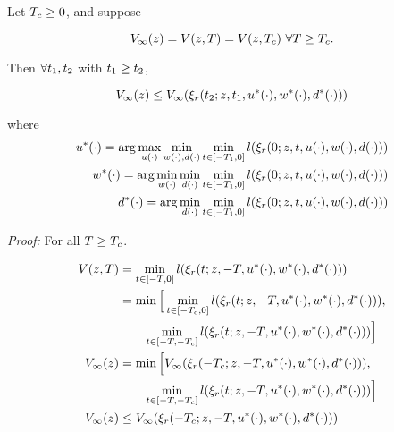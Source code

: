  \begin{thm}
   Let $T_c \ge 0$, and suppose
   
   \begin{equation}
   \label{eq:conv_valfunc}
   V_\infty(z) = V(z, T) = V(z, T_c) ~ \forall T \ge T_c.
   \end{equation}
   
   Then $\forall t_1, t_2$ with $t_1 \ge t_2$,
   
   \begin{equation}
   V_\infty(z) \le V_\infty(\xi_r(t_2; z, t_1, u^*(\cdot), w^*(\cdot), d^*(\cdot))) 
   \end{equation}
   
   \noindent where
   \begin{equation}
   \begin{aligned}
   u^*(\cdot) = \arg \max_{u(\cdot)} \min_{w(\cdot), d(\cdot)} \min_{t \in [-T_1, 0]} l(\xi_r(0; z, t, u(\cdot), w(\cdot), d(\cdot))) \\
   w^*(\cdot) = \arg \min_{w(\cdot)} \min_{d(\cdot)} \min_{t \in [-T_1, 0]} l(\xi_r(0; z, t, u(\cdot), w(\cdot), d(\cdot))) \\
   d^*(\cdot) = \arg \min_{d(\cdot)} \min_{t \in [-T_1, 0]} l(\xi_r(0; z, t, u(\cdot), w(\cdot), d(\cdot))) 
   \end{aligned}
   \end{equation}
   
 \end{thm}
 
\textit{Proof:} For all $T \ge T_c$.
   
   \begin{equation}
   \begin{aligned}
   V(z, T) &= \min_{t \in [-T, 0]} l(\xi_r(t; z, -T, u^*(\cdot), w^*(\cdot), d^*(\cdot))) \\
   &= \min \Big[ \min_{t \in [-T_c, 0]} l(\xi_r(t; z, -T, u^*(\cdot), w^*(\cdot), d^*(\cdot))), \\
   &\qquad\min_{t \in [-T, -T_c]} l(\xi_r(t; z, -T, u^*(\cdot), w^*(\cdot), d^*(\cdot))) \Big] \\
   V_\infty(z) &= \min \Big[ V_\infty(\xi_r(-T_c; z, -T, u^*(\cdot), w^*(\cdot), d^*(\cdot))), \\
   &\qquad\min_{t \in [-T, -T_c]} l(\xi_r(t; z, -T, u^*(\cdot), w^*(\cdot), d^*(\cdot))) \Big] \\
   V_\infty(z) &\le V_\infty(\xi_r(-T_c; z, -T, u^*(\cdot), w^*(\cdot), d^*(\cdot))) \\
   \end{aligned}
   \end{equation}
   
